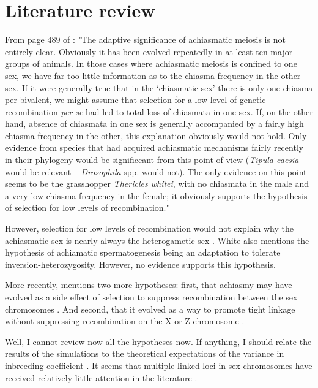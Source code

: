 \documentclass[a4paper,12pt]{article}
\begin{document}
\section{Literature review}
From page 489 of \cite{White1973}: "The adaptive significance of achiasmatic meiosis is not entirely clear. Obviously it has been evolved repeatedly in at least ten major groups of animals. In those cases where achiasmatic meiosis is confined to one sex, we have far too little information as to the chiasma frequency in the other sex. If it were generally true that in the `chiasmatic sex' there is only one chiasma per bivalent, we might assume that selection for a low level of genetic recombination \emph{per se} had led to total loss of chiasmata in one sex. If, on the other hand, absence of chiasmata in one sex is generally accompanied by a fairly high chiasma frequency in the other, this explanation obviously would not hold. Only evidence from species that had acquired achiasmatic mechanisms fairly recently in their phylogeny would be significcant from this point of view (\emph{Tipula caesia} would be relevant -- \emph{Drosophila} spp. would not). The only evidence on this point seems to be the grasshopper \emph{Thericles whitei}, with no chiasmata in the male and a very low chiasma frequency in the female; it obviously supports the hypothesis of selection for low levels of recombination."

However, selection for low levels of recombination would not explain why the achiasmatic sex is nearly always the heterogametic sex \cite{Burt1991}. White also mentions the hypothesis of achiamatic spermatogenesis being an adaptation to tolerate inversion-heterozygosity. However, no evidence supports this hypothesis.

More recently, \cite{Lenormand2016} mentions two more hypotheses: first, that achiasmy may have evolved as a side effect of selection to suppress recombination between the sex chromosomes \cite{Haldane1922,Huxley1928}. And second, that it evolved as a way to promote tight linkage without suppressing recombination on the X or Z chromosome \cite{Lenormand2005}.

Well, I cannot review now all the hypotheses now. If anything, I should relate the results of the simulations to the theoretical expectations of the variance in inbreeding coefficient \cite{Cockerman1968,Franklin1977}. It seems that multiple linked loci in sex chromosomes have received relatively little attention in the literature \cite{Bennett1963,Owen1988}.
\end{document}
